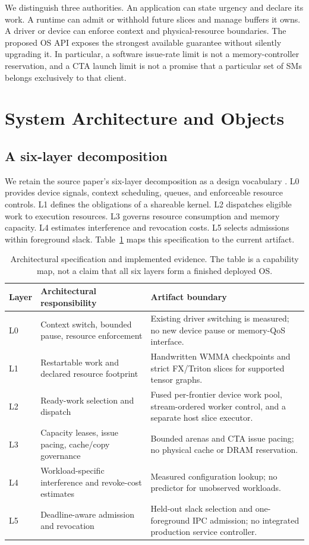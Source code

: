 We distinguish three authorities. An application can state urgency and
declare its work. A runtime can admit or withhold future slices and manage
buffers it owns. A driver or device can enforce context and physical-resource
boundaries. The proposed OS API exposes the strongest available guarantee
without silently upgrading it. In particular, a software issue-rate limit is
not a memory-controller reservation, and a CTA launch limit is not a promise
that a particular set of SMs belongs exclusively to that client.

\section{System Architecture and Objects}
\label{sec:architecture}
\subsection{A six-layer decomposition}
We retain the source paper's six-layer decomposition as a design vocabulary
\cite{Nourai2026GPUOS}. L0 provides device signals, context scheduling,
queues, and enforceable resource controls. L1 defines the obligations of a
shareable kernel. L2 dispatches eligible work to execution resources. L3
governs resource consumption and memory capacity. L4 estimates interference
and revocation costs. L5 selects admissions within foreground slack.
Table~\ref{tab:layers} maps this specification to the current artifact.

\begin{table}[t]
\centering\small
\begin{tabular}{p{}p{}p{}}
\toprule
Layer & Architectural responsibility & Artifact boundary \\
\midrule
L0 & Context switch, bounded pause, resource enforcement & Existing driver switching is measured; no new device pause or memory-QoS interface. \\
L1 & Restartable work and declared resource footprint & Handwritten WMMA checkpoints and strict FX/Triton slices for supported tensor graphs. \\
L2 & Ready-work selection and dispatch & Fused per-frontier device work pool, stream-ordered worker control, and a separate host slice executor. \\
L3 & Capacity leases, issue pacing, cache/copy governance & Bounded arenas and CTA issue pacing; no physical cache or DRAM reservation. \\
L4 & Workload-specific interference and revoke-cost estimates & Measured configuration lookup; no predictor for unobserved workloads. \\
L5 & Deadline-aware admission and revocation & Held-out slack selection and one-foreground IPC admission; no integrated production service controller. \\
\bottomrule
\end{tabular}
\caption{Architectural specification and implemented evidence. The table is
a capability map, not a claim that all six layers form a finished deployed OS.}
\label{tab:layers}
\end{table}

